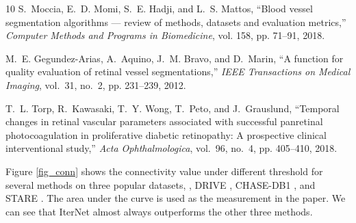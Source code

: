 \documentclass[10pt,twocolumn,letterpaper]{article}
\begin{document}
{\begin{thebibliography}{10}
	S.~Moccia, E.~D. Momi, S.~E. Hadji, and L.~S. Mattos, ``Blood vessel
	segmentation algorithms — review of methods, datasets and evaluation
	metrics,'' \emph{Computer Methods and Programs in Biomedicine}, vol. 158, pp.
	71--91, 2018.
	
	M.~E. {Gegundez-Arias}, A.~{Aquino}, J.~M. {Bravo}, and D.~{Marin}, ``A
	function for quality evaluation of retinal vessel segmentations,'' \emph{IEEE
		Transactions on Medical Imaging}, vol.~31, no.~2, pp. 231--239, 2012.
	
	T.~L. Torp, R.~Kawasaki, T.~Y. Wong, T.~Peto, and J.~Grauslund, ``Temporal
	changes in retinal vascular parameters associated with successful panretinal
	photocoagulation in proliferative diabetic retinopathy: A prospective
	clinical interventional study,'' \emph{Acta Ophthalmologica}, vol.~96, no.~4,
	pp. 405--410, 2018.
	
\end{thebibliography}
}


\pagebreak
\clearpage

\setcounter{equation}{0}
\setcounter{figure}{0}
\setcounter{table}{0}
\setcounter{page}{1}
\makeatletter


\begin{figure*}
	\setlength{\fboxsep}{0pt}\setlength{\fboxrule}{0.2pt}

	\centering
	\hfil
	\hfil
	\caption{Connectivity versus threshold on the three datasets: (a) DRIVE. (b) CHASE-DB1. (c) STARE.}
	\label{fig_conn}
\end{figure*}

Figure \ref{fig_conn} shows the connectivity value under different threshold for several methods on three popular datasets, \ie, DRIVE \cite{Sstaal:2004-855}, CHASE-DB1 \cite{Sowen2009measuring}, and STARE \cite{S845178}. The area under the curve is used as the measurement in the paper. We can see that IterNet almost always outperforms the other three methods.
\end{document}
